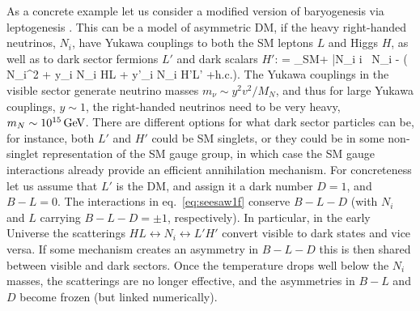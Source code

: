 \smallskip


As a concrete example let us consider a modified version of baryogenesis via leptogenesis \cite{BaryoLeptogenesis}. This can be a model of asymmetric DM, if the heavy right-handed neutrinos, $N_i$, have Yukawa couplings to both the SM leptons $L$ and Higgs $H$, as well as to dark sector fermions  $L'$ and dark scalars $H'$:
\beq\label{eq:seesaw1f}
\Lag = \Lag_{\rm SM}+ \bar N_i  i \slashed{\partial}\, N_i -
\left( N_i^2 + y_i N_i HL  + y'_i N_i H'L' +\hbox{h.c.}\right).\eeq
The Yukawa couplings in the visible sector generate neutrino masses $m_\nu \sim y^2 v^2/M_N$, 
and thus for large Yukawa couplings, $y\sim1$, the right-handed neutrinos need to be very heavy, $m_N\sim 10^{15}\,{\rm GeV}$.
There are different options for what dark sector particles can be, for instance, both $L'$ and $H'$ could be SM singlets, 
or they could be in some non-singlet representation of the SM gauge group, in which case the SM gauge interactions already provide an efficient annihilation mechanism. For concreteness let us assume that  $L'$ is the DM, and assign it a dark number $D=1$, and $B-L=0$. 
The interactions in eq.~\eqref{eq:seesaw1f} conserve $B-L-D$ (with   $N_i$ and $L$ carrying $B-L-D=\pm 1$, respectively).  
In particular, in the early Universe the scatterings $HL\leftrightarrow N_i \leftrightarrow L'H'$ convert visible to dark states and vice versa. If some mechanism creates an asymmetry in $B-L-D$ this is then shared between visible and dark sectors. Once the temperature drops well below the $N_i$ masses, the scatterings are no longer effective, and the asymmetries in $B-L$ and $D$ become frozen (but linked numerically).  


